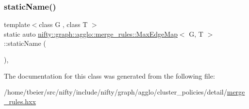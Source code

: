 \subsubsection{\texorpdfstring{static\+Name()}{staticName()}}
{\footnotesize\ttfamily template$<$class G , class T $>$ \\
static auto \hyperlink{classnifty_1_1graph_1_1agglo_1_1merge__rules_1_1MaxEdgeMap}{nifty\+::graph\+::agglo\+::merge\+\_\+rules\+::\+Max\+Edge\+Map}$<$ G, T $>$\+::static\+Name (\begin{DoxyParamCaption}{ }\end{DoxyParamCaption})\hspace{0.3cm}{\ttfamily [inline]}, {\ttfamily [static]}}



The documentation for this class was generated from the following file\+:\begin{DoxyCompactItemize}
\item 
/home/tbeier/src/nifty/include/nifty/graph/agglo/cluster\+\_\+policies/detail/\hyperlink{merge__rules_8hxx}{merge\+\_\+rules.\+hxx}\end{DoxyCompactItemize}
